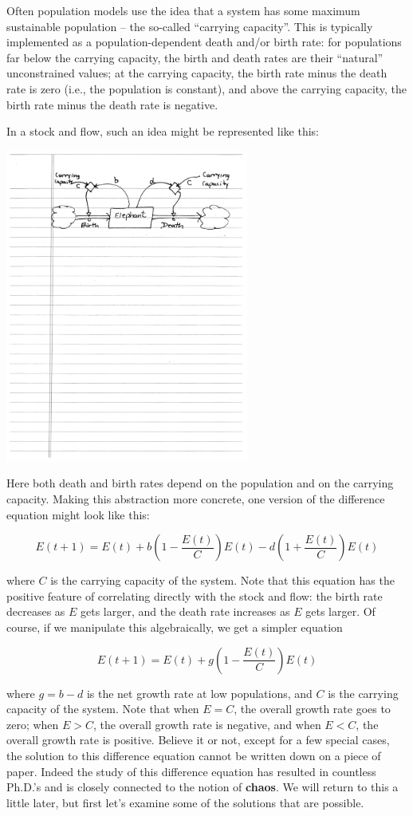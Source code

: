 \documentclass{tufte-handout}
\begin{document}
Often population models use the idea that a system has some maximum sustainable population -- the so-called ``carrying capacity''.  This is typically implemented as a population-dependent death and/or birth rate:  for populations far below the carrying capacity, the birth and death rates are their ``natural'' unconstrained values; at the carrying capacity, the birth rate minus the death rate is zero (i.e., the population is constant), and above the carrying capacity, the birth rate minus the death rate is negative.

In a stock and flow, such an idea might be represented like this:

\centerline{\includegraphics[width=8cm]{figs/carrying_capacity_model}}

Here both death and birth rates depend on the population and on the carrying capacity.  Making this abstraction more concrete, one version of the difference equation might look like this:

$$E(t+1) = E(t) + b(1-\frac{E(t)}{C}) E(t) - d(1+\frac{E(t)}{C})E(t)$$

where $C$ is the carrying capacity of the system.  Note that this equation has the positive feature of correlating directly with the stock and flow:  the birth rate decreases as $E$ gets larger, and the death rate increases as $E$ gets larger.  Of course, if we manipulate this algebraically, we get a simpler equation
 
$$E(t+1) = E(t) + g(1-\frac{E(t)}{C})E(t)$$

where $g = b-d$ is the net growth rate at low populations, and $C$ is the carrying capacity of the system.  Note that when $E=C$, the overall growth rate goes to zero; when $E>C$, the overall growth rate is negative, and when $E<C$, the overall growth rate is positive. Believe it or not, except for a few special cases, the solution to this difference equation cannot be written down on a piece of paper. Indeed the study of this difference equation has resulted in countless Ph.D.'s and is closely connected to the notion of {\bf chaos}. We will return to this a little later, but first let's examine some of the solutions that are possible. 
\end{document}
